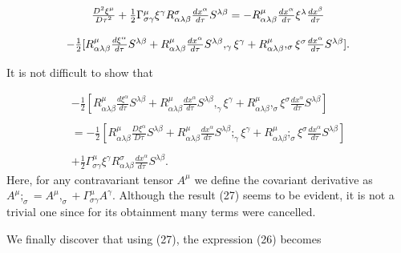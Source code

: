 \documentclass[a4paper,12pt]{article}
\begin{document}
\begin{equation}
\begin{array}{c}
\frac{D^{2}\xi^{\mu}}{D\tau^{2}}+\frac{1}{2}\Gamma_{\sigma\gamma}^{\mu}\xi^{%
\gamma}R_{\alpha\lambda\beta}^{\sigma}\frac{dx^{\alpha}}{d\tau}%
S^{\lambda\beta}=-R_{\alpha\lambda\beta}^{\mu}\frac{dx^{\alpha}}{d\tau}%
\xi^{\lambda}\frac{dx^{\beta}}{d\tau} \\ 
\\ 
-\frac{1}{2}[R_{\alpha\lambda\beta}^{\mu}\frac{d\xi^{\alpha}}{d\tau}%
S^{\lambda\beta}+R_{\alpha\lambda\beta}^{\mu}\frac{dx^{\alpha}}{d\tau }%
S^{\lambda\beta},_{\gamma}\xi^{\gamma}+R_{\alpha\lambda\beta}^{\mu},_{\sigma
}\xi^{\sigma}\frac{dx^{\alpha}}{d\tau}S^{\lambda\beta}].
\end{array}
\label{26}
\end{equation}

It is not difficult to show that

\begin{equation}
\begin{array}{c}
-\frac{1}{2}[R_{\alpha \lambda \beta }^{\mu }\frac{d\xi ^{\alpha }}{d\tau }%
S^{\lambda \beta }+R_{\alpha \lambda \beta }^{\mu }\frac{dx^{\alpha }}{d\tau 
}S^{\lambda \beta },_{\gamma }\xi ^{\gamma }+R_{\alpha \lambda \beta }^{\mu
},_{\sigma }\xi ^{\sigma }\frac{dx^{\alpha }}{d\tau }S^{\lambda \beta }] \\ 
\\ 
=-\frac{1}{2}[R_{\alpha \lambda \beta }^{\mu }\frac{D\xi ^{\alpha }}{D\tau }%
S^{\lambda \beta }+R_{\alpha \lambda \beta }^{\mu }\frac{dx^{\alpha }}{d\tau 
}S^{\lambda \beta };_{\gamma }\xi ^{\gamma }+R_{\alpha \lambda \beta }^{\mu
};_{\sigma }\xi ^{\sigma }\frac{dx^{\alpha }}{d\tau }S^{\lambda \beta }] \\ 
\\ 
+\frac{1}{2}\Gamma _{\sigma \gamma }^{\mu }\xi ^{\gamma }R_{\alpha \lambda
\beta }^{\sigma }\frac{dx^{\alpha }}{d\tau }S^{\lambda \beta }.
\end{array}
\label{27}
\end{equation}
Here, for any contravariant tensor $A^{\mu }$ we define the covariant
derivative as $A^{\mu };_{\sigma }=A^{\mu },_{\sigma }+\Gamma _{\sigma
\gamma }^{\mu }A^{\gamma }.$ Although the result (27) seems to be evident,
it is not a trivial one since for its obtainment many terms were cancelled.

We finally discover that using (27), the expression (26) becomes
\end{document}
